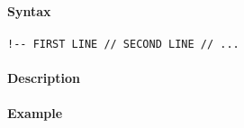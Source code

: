 


	\paragraph{Syntax}

\begin{verbatim}
!-- FIRST LINE // SECOND LINE // ...
\end{verbatim}

\paragraph{Description}

\paragraph{Example}


